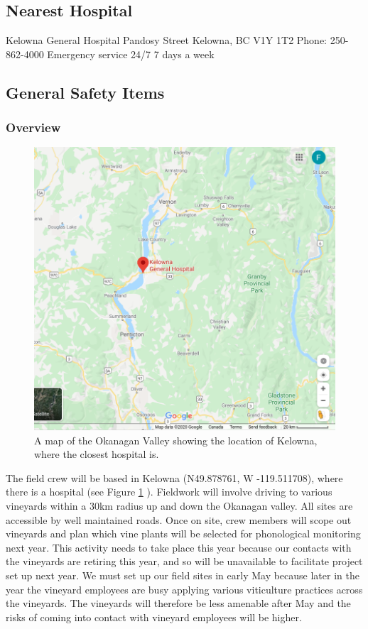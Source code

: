 \documentclass[11pt,letter]{article}
\begin{document}
\subsection {Nearest Hospital}
Kelowna General Hospital  Pandosy Street\newline
Kelowna, BC V1Y 1T2\newline
Phone: 250-862-4000\newline
Emergency service 24/7 7 days a week


\subsection {General Safety Items}

\subsubsection{Overview}
\begin{figure}
  \includegraphics[width=\linewidth]{OkanaganMap.png}
  \caption{A map of the Okanagan Valley showing the location of Kelowna, where the closest hospital is.}
  \label{fig:OkanMap}
\end{figure}
The field crew will be based in Kelowna (N49.878761, W -119.511708), where there is a hospital (see Figure \ref{fig:OkanMap} ). Fieldwork will involve driving to various vineyards within a 30km radius up and down the Okanagan valley. All sites are accessible by well maintained roads. Once on site, crew members will scope out vineyards and plan which vine plants will be selected for phonological monitoring next year. This activity needs to take place this year because our contacts with the vineyards are retiring this year, and so will be unavailable to facilitate project set up next year. We must set up our field sites in early May because later in the year the vineyard employees are busy applying various viticulture practices across the vineyards. The vineyards will therefore be less amenable after May and the risks of coming into contact with vineyard employees will be higher.   
\end{document}
